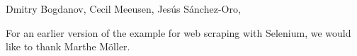 Dmitry Bogdanov, Cecil Meeusen, Jesús Sánchez-Oro,

For an earlier version of the example for web scraping with Selenium, we would like to thank Marthe Möller.
